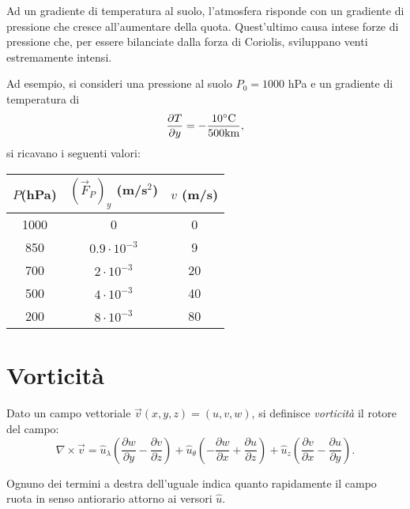 Ad un gradiente di temperatura al suolo, l'atmosfera risponde con un gradiente di pressione che cresce all'aumentare della quota. Quest'ultimo causa intese forze di pressione che, per essere bilanciate dalla forza di Coriolis, sviluppano venti estremamente intensi. 

Ad esempio, si consideri una pressione al suolo $P_0=1000$ hPa e un gradiente di temperatura di
\begin{equation}
\frac{\partial T}{\partial y}=-\frac{10\degree\text{C}}{500\text{km}},
\end{equation}
si ricavano i seguenti valori:
\begin{table}[h]
	\centering
	\begin{tabular}{c|c|c}
		$P$(hPa) & $(\vec{F}_P)_y$ (m/s$^2$) & $v$ (m/s)  \\ \hline
		1000 & 0 & 0 \\ \hline
		850  & $0.9 \cdot 10^{-3}$ & 9 \\ \hline
		700  & $2 \cdot 10^{-3}$ & 20 \\ \hline
		500  & $4\cdot 10^{-3}$ &40 \\ \hline
		200  & $8\cdot 10^{-3}$ & 80 
	
	\end{tabular}
\end{table}

\section{Vorticità}
Dato un campo vettoriale $\vec{v}(x,y,z)=(u, v, w)$, si definisce \emph{vorticità} il rotore del campo:
\begin{equation}
	\nabla \times \vec{v}=\hat{u}_\lambda\left(\frac{\partial w}{\partial y}- \frac{\partial v}{\partial z}\right) 
	+\hat{u}_\theta\left(-\frac{\partial w}{\partial x}+\frac{\partial u}{\partial z}\right)
	+\hat{u}_z\left(\frac{\partial v}{\partial x}-\frac{\partial u}{\partial y}\right).
\end{equation}

Ognuno dei termini a destra dell'uguale indica quanto rapidamente il campo ruota in senso antiorario attorno ai versori $\hat{u}$.


